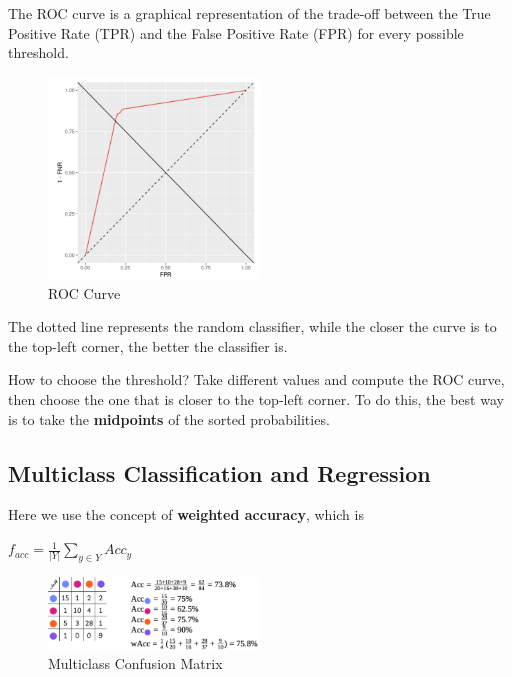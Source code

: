 \begin{definitionblock}
    The ROC curve is a graphical representation of the trade-off between the True Positive Rate (TPR) and the False Positive Rate (FPR) for every possible threshold.
\end{definitionblock}

\begin{figure}[H]
    \centering
    \includegraphics[width=0.5\textwidth]{assets/fig8.png}
    \caption{ROC Curve}
\end{figure}

The dotted line represents the random classifier, while the closer the curve is to the top-left corner, the better the classifier is.

How to choose the threshold? Take different values and compute the ROC curve, then choose the one that is closer to the top-left corner. To do this, the best way is to take the \textbf{midpoints} of the sorted probabilities.

\newpage 

\subsection{Multiclass Classification and Regression}

Here we use the concept of \textbf{weighted accuracy}, which is 
    
    $f_{acc} = \frac{1}{|Y|}\sum_{y \in Y}^{}Acc_y$

\begin{figure}[H]
    \centering
    \includegraphics[width=0.5\textwidth]{assets/fig9.png}
    \caption{Multiclass Confusion Matrix}
\end{figure}

